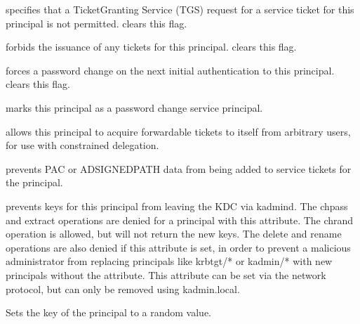 \documentclass[letterpaper,10pt,english]{sphinxmanual}
\begin{document}
\begin{description}
\sphinxAtStartPar
{} specifies that a Ticket\sphinxhyphen{}Granting Service (TGS)
request for a service ticket for this principal is not permitted.
 clears this flag.

\sphinxAtStartPar
{} forbids the issuance of any tickets for this
principal.   clears this flag.

\sphinxAtStartPar
{} forces a password change on the next initial
authentication to this principal.   clears this
flag.

\sphinxAtStartPar
{} marks this principal as a password
change service principal.

\sphinxAtStartPar
{} allows this principal to acquire
forwardable tickets to itself from arbitrary users, for use with
constrained delegation.

\sphinxAtStartPar
{} prevents PAC or AD\sphinxhyphen{}SIGNEDPATH data from
being added to service tickets for the principal.

\sphinxAtStartPar
{} prevents keys for this principal from leaving
the KDC via kadmind.  The chpass and extract operations are denied
for a principal with this attribute.  The chrand operation is
allowed, but will not return the new keys.  The delete and rename
operations are also denied if this attribute is set, in order to
prevent a malicious administrator from replacing principals like
krbtgt/* or kadmin/* with new principals without the attribute.
This attribute can be set via the network protocol, but can only
be removed using kadmin.local.

\sphinxAtStartPar
Sets the key of the principal to a random value.


\end{description}
\end{document}
